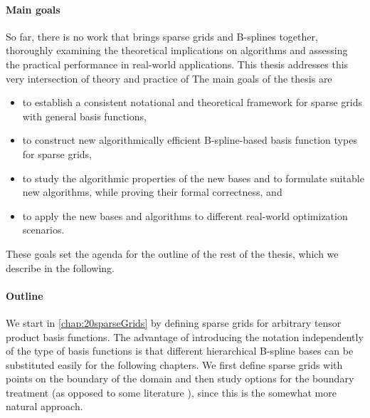 \paragraph{Main goals}

So far, there is no work that brings sparse grids and B-splines together,
thoroughly examining the theoretical implications on algorithms and
assessing the practical performance in real-world applications.
This thesis addresses this very intersection of theory and practice of
The main goals of the thesis are
\begin{itemize}
  \item
  to establish a consistent notational and theoretical
  framework for sparse grids with general basis functions,
  
  \item
  to construct new algorithmically efficient
  B-spline-based basis function types for sparse grids,
  
  \item
  to study the algorithmic properties of the new bases and
  to formulate suitable new algorithms,
  while proving their formal correctness, and
  
  \item
  to apply the new bases and algorithms to different real-world
  optimization scenarios.
\end{itemize}
These goals set the agenda for the outline of the rest of the thesis,
which we describe in the following.

\paragraph{Outline}

We start in \cref{chap:20sparseGrids} by defining sparse grids
for arbitrary tensor product basis functions.
The advantage of introducing the notation independently
of the type of basis functions is that
different hierarchical B-spline bases can be substituted easily
for the following chapters.
We first define sparse grids with points on the boundary of the domain
and then study options for the boundary treatment
(as opposed to some literature %
),
since this is the somewhat more natural approach.

